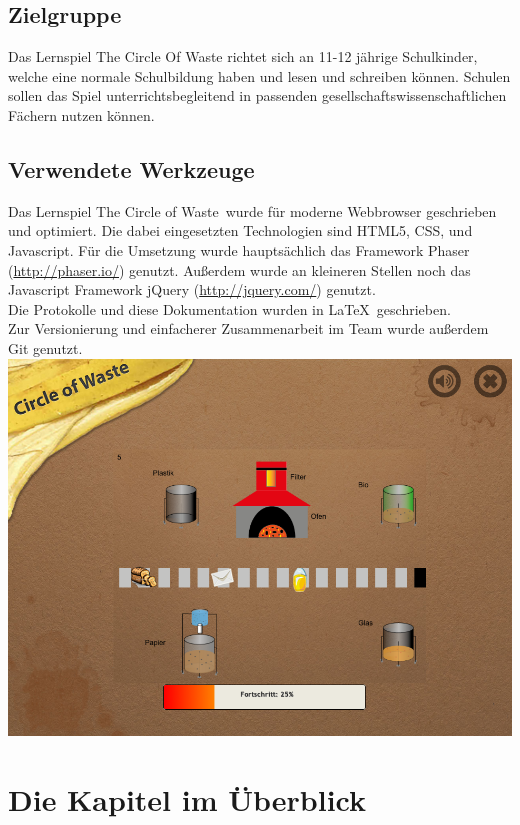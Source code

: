 \documentclass[a4paper]{article}
\begin{document}
\pagebreak

    \subsection{Zielgruppe}
        Das Lernspiel The Circle Of Waste richtet sich an 11-12 jährige Schulkinder, welche eine normale Schulbildung haben und lesen und schreiben können. Schulen sollen das Spiel unterrichtsbegleitend in passenden gesellschaftswissenschaftlichen Fächern nutzen können.

    \subsection{Verwendete Werkzeuge}
        Das Lernspiel \glqq The Circle of Waste\grqq\ wurde für moderne Webbrowser geschrieben und optimiert. Die dabei eingesetzten Technologien sind HTML5, CSS, und Javascript. Für die Umsetzung wurde hauptsächlich das Framework Phaser (\url{http://phaser.io/}) genutzt. Außerdem wurde an kleineren Stellen noch das Javascript Framework jQuery (\url{http://jquery.com/}) genutzt.\\
        Die Protokolle und diese Dokumentation wurden in \LaTeX\ geschrieben.\\
        Zur Versionierung und einfacherer Zusammenarbeit im Team wurde außerdem Git genutzt.\\

    \includegraphics[width=\linewidth]{kapitel4.png}

\pagebreak

\section{Die Kapitel im Überblick}
\end{document}
